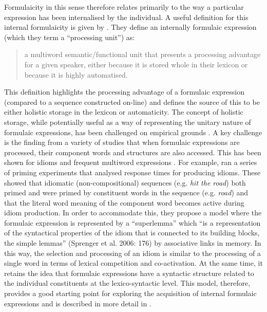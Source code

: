\documentclass[output=paper]{langscibook}
\begin{document}
Formulaicity in this sense therefore relates primarily to the way a particular expression has been internalised by the individual. A useful definition for this internal formulaicity is given by \citet{MylesCordier2017}. They define an internally formulaic expression (which they term a ``processing unit'') as: 

\begin{quote}
a multiword semantic/functional unit that presents a processing advantage for a given speaker, either because it is stored whole in their lexicon or because it is highly automatised.
\end{quote}

This definition highlights the processing advantage of a formulaic expression (compared to a sequence constructed on-line) and defines the source of this to be either holistic storage in the lexicon or automaticity. The concept of holistic storage, while potentially useful as a way of representing the unitary nature of formulaic expressions, has been challenged on empirical grounds \citep{Siyanova-Chanturia2015}.  A key challenge is the finding from a variety of studies that when formulaic expressions are processed, their component words and structures are also accessed. This has been shown for idioms \citep{SprengerEtAl2006} and frequent multiword expressions \citep{ArnonPriva2014}. For example, \citet{SprengerEtAl2006} ran a series of priming experiments that analysed response times for producing idioms. These showed that idiomatic (non-compositional) sequences (e.g. \textit{hit the road}) both primed and were primed by constituent words in the sequence (e.g. \textit{road}) and that the literal word meaning of the component word becomes active during idiom production. In order to accommodate this, they propose a model where the formulaic expression is represented by a ``superlemma'' which “is a representation of the syntactical properties of the idiom that is connected to its building blocks, the simple lemmas” (Sprenger et al. 2006: 176) by associative links in memory. In this way, the selection and processing of an idiom is similar to the processing of a single word in terms of lexical competition and co-activation. At the same time, it retains the idea that formulaic expressions have a syntactic structure related to the individual constituents at the lexico-syntactic level. This model, therefore, provides a good starting point for exploring the acquisition of internal formulaic expressions and is described in more detail in .
\end{document}
